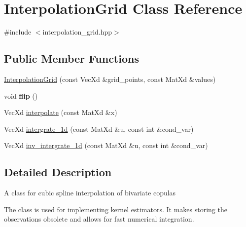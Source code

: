 \hypertarget{class_interpolation_grid}{\section{Interpolation\+Grid Class Reference}
\label{class_interpolation_grid}
}


{\ttfamily \#include $<$interpolation\+\_\+grid.\+hpp$>$}

\subsection*{Public Member Functions}
\begin{DoxyCompactItemize}
\item 
\hyperlink{class_interpolation_grid_aed2639844689b97483d665feb5d0d0f7}{Interpolation\+Grid} (const Vec\+Xd \&grid\+\_\+points, const Mat\+Xd \&values)
\item 
\hypertarget{class_interpolation_grid_a07cca3a1e214f98fc9bafa2a6379f789}{void {\bfseries flip} ()}\label{class_interpolation_grid_a07cca3a1e214f98fc9bafa2a6379f789}

\item 
Vec\+Xd \hyperlink{class_interpolation_grid_a9e65596940b5e561ef6332d2559feb57}{interpolate} (const Mat\+Xd \&x)
\item 
Vec\+Xd \hyperlink{class_interpolation_grid_a90af7bd3f2646109be939fc48b2284ca}{intergrate\+\_\+1d} (const Mat\+Xd \&u, const int \&cond\+\_\+var)
\item 
Vec\+Xd \hyperlink{class_interpolation_grid_aba233f98f869c2aeff0d920a1dd477d6}{inv\+\_\+intergrate\+\_\+1d} (const Mat\+Xd \&u, const int \&cond\+\_\+var)
\end{DoxyCompactItemize}


\subsection{Detailed Description}
A class for cubic spline interpolation of bivariate copulas

The class is used for implementing kernel estimators. It makes storing the observations obsolete and allows for fast numerical integration. 


